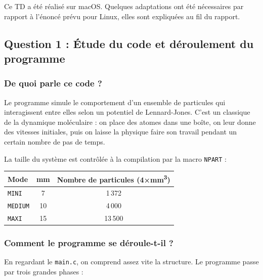 \documentclass[12pt,a4paper]{article}
\begin{document}
\begin{notebox}
Ce TD a été réalisé sur macOS. Quelques adaptations ont été nécessaires par rapport à l'énoncé prévu pour Linux, elles sont expliquées au fil du rapport.
\end{notebox}


\subsection{Question 1 : Étude du code et déroulement du programme}

\subsubsection{De quoi parle ce code ?}

Le programme simule le comportement d'un ensemble de particules qui interagissent entre elles selon un potentiel de Lennard-Jones. C'est un classique de la dynamique moléculaire : on place des atomes dans une boîte, on leur donne des vitesses initiales, puis on laisse la physique faire son travail pendant un certain nombre de pas de temps.

La taille du système est contrôlée à la compilation par la macro \texttt{NPART} :

\begin{center}
\begin{tabular}{lcc}
\toprule
\textbf{\color{mainblue}Mode} & \textbf{\color{mainblue}mm} & \textbf{\color{mainblue}Nombre de particules (4×mm\textsuperscript{3})} \\
\midrule
\texttt{MINI}   & 7  & 1\,372  \\
\texttt{MEDIUM} & 10 & 4\,000  \\
\texttt{MAXI}   & 15 & 13\,500 \\
\bottomrule
\end{tabular}
\end{center}

\subsubsection{Comment le programme se déroule-t-il ?}

En regardant le \texttt{main.c}, on comprend assez vite la structure. Le programme passe par trois grandes phases :
\end{document}

